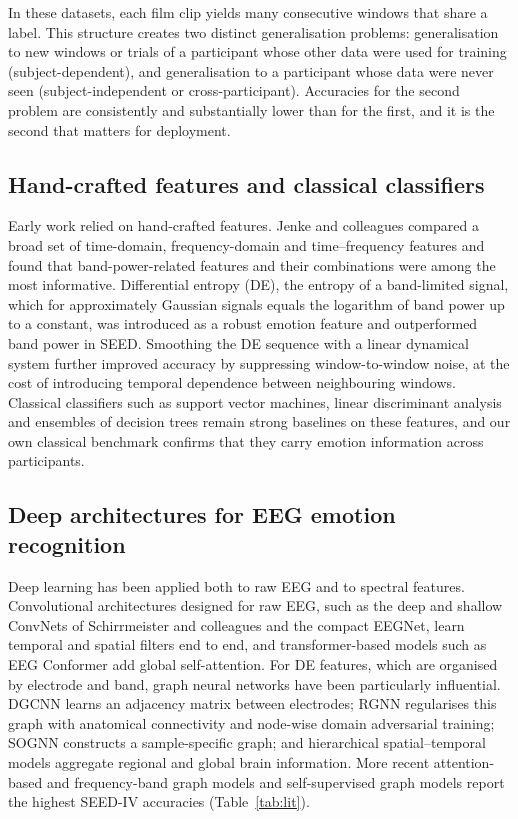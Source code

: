 In these datasets, each film clip yields many consecutive windows that share a label. This structure creates two distinct generalisation problems: generalisation to new windows or trials of a participant whose other data were used for training (subject-dependent), and generalisation to a participant whose data were never seen (subject-independent or cross-participant). Accuracies for the second problem are consistently and substantially lower than for the first\cite{jayaram,wu}, and it is the second that matters for deployment.


\subsection{Hand-crafted features and classical classifiers}
Early work relied on hand-crafted features. Jenke and colleagues compared a broad set of time-domain, frequency-domain and time–frequency features and found that band-power-related features and their combinations were among the most informative\cite{jenke}. Differential entropy (DE), the entropy of a band-limited signal, which for approximately Gaussian signals equals the logarithm of band power up to a constant, was introduced as a robust emotion feature\cite{duan} and outperformed band power in SEED\cite{seed}. Smoothing the DE sequence with a linear dynamical system further improved accuracy by suppressing window-to-window noise\cite{seed}, at the cost of introducing temporal dependence between neighbouring windows. Classical classifiers such as support vector machines, linear discriminant analysis and ensembles of decision trees remain strong baselines on these features\cite{lotte,xgboost}, and our own classical benchmark confirms that they carry emotion information across participants.


\subsection{Deep architectures for EEG emotion recognition}
Deep learning has been applied both to raw EEG and to spectral features\cite{craik,roy}. Convolutional architectures designed for raw EEG, such as the deep and shallow ConvNets of Schirrmeister and colleagues\cite{schirrmeister} and the compact EEGNet\cite{eegnet}, learn temporal and spatial filters end to end, and transformer-based models such as EEG Conformer add global self-attention\cite{conformer,vaswani}. For DE features, which are organised by electrode and band, graph neural networks have been particularly influential. DGCNN learns an adjacency matrix between electrodes\cite{dgcnn}; RGNN regularises this graph with anatomical connectivity and node-wise domain adversarial training\cite{rgnn}; SOGNN constructs a sample-specific graph\cite{sognn}; and hierarchical spatial–temporal models aggregate regional and global brain information\cite{regional}. More recent attention-based and frequency-band graph models\cite{attgraph,bfenet} and self-supervised graph models\cite{ssemerge} report the highest SEED-IV accuracies (Table~\ref{tab:lit}).

